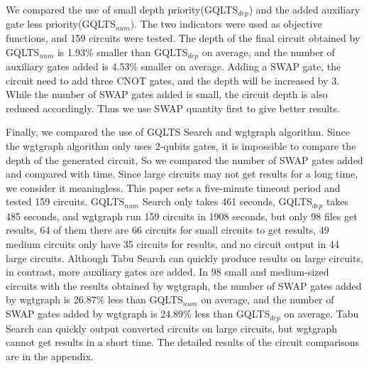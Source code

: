 \documentclass[runningheads]{llncs}
\begin{document}
We compared the use of small depth priority(GQLTS$_{dep}$) and the added auxiliary gate less priority(GQLTS$_{num}$). 
The two indicators were used as objective functions, 
and 159 circuits were tested. 
The depth of the final circuit obtained by GQLTS$_{num}$ is 1.93\% smaller than GQLTS$_{dep}$ on average, 
and the number of auxiliary gates added is 4.53\% smaller on average.
Adding a SWAP gate, the circuit need to add three CNOT gates, 
and the depth will be increased by 3. 
While the number of SWAP gates added is small, the circuit depth is also reduced accordingly.
Thus we use SWAP quantity first to give better results. 

 Finally, we compared the use of GQLTS Search and wgtgraph algorithm. 
 Since the wgtgraph algorithm only uses 2-qubits gates, 
 it is impossible to compare the depth of the generated circuit, 
 So we compared the number of SWAP gates added and compared with time.
 Since large circuits may not get results for a long time, we consider it meaningless. 
 This paper sets a five-minute timeout period and tested 159 circuits. 
 GQLTS$_{num}$ Search only takes 461 seconds, GQLTS$_{dep}$ takes 485 seconds, 
 and wgtgraph run 159 circuits in 1908 seconds, 
 but only 98 files get results, 
 64 of them there are 66 circuits for small circuits to get results, 
 49 medium circuits only have 35 circuits for results, 
 and no circuit output in 44 large circuits.
 Although Tabu Search can quickly produce results on large circuits, in contrast, 
 more auxiliary gates are added. 
 In 98 small and medium-sized circuits with the results obtained by wgtgraph, 
 the number of SWAP gates added by wgtgraph is 26.87\% less than GQLTS$_{num}$ on average, 
 and the number of SWAP gates added by wgtgraph is 24.89\% less than GQLTS$_{dep}$ on average. 
Tabu Search can quickly output converted circuits on large circuits, 
but wgtgraph cannot get results in a short time.
 The detailed results of the circuit comparisons are in the appendix. 
\end{document}
